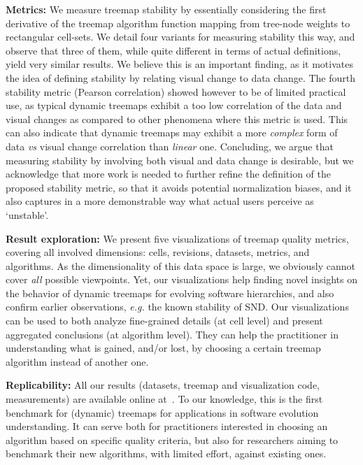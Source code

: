 \noindent\textbf{Metrics:} We measure treemap stability by essentially considering the first derivative of the treemap algorithm function mapping from tree-node weights to rectangular cell-sets. We detail four variants for measuring stability this way, and observe that three of them, while quite different in terms of actual definitions, yield very similar results. We believe this is an important finding, as it motivates the idea of defining stability by relating visual change to data change. The fourth stability metric (Pearson correlation) showed however to be of limited practical use, as typical dynamic treemaps exhibit a too low correlation of the data and visual changes as compared to other phenomena where this metric is used. This can also indicate that dynamic treemaps may exhibit a more \emph{complex} form of data \emph{vs} visual change correlation than \emph{linear} one. 
Concluding, we argue that measuring stability by involving both visual and data change is desirable, but we acknowledge that more work is needed to further refine the definition of the proposed stability metric, so that it avoids potential normalization biases, and it also captures in a more demonstrable way what actual users perceive as `unstable'.

\noindent\textbf{Result exploration:} We present five visualizations of treemap quality metrics, covering all involved dimensions: cells, revisions, datasets, metrics, and algorithms. As the dimensionality of this data space is large, we obviously cannot cover \emph{all} possible viewpoints. Yet, our visualizations help finding novel insights on the behavior of dynamic treemaps for evolving software hierarchies, and also confirm earlier observations, \emph{e.g.} the known stability of SND. Our visualizations can be used to both analyze fine-grained details (at cell level) and present aggregated conclusions (at algorithm level). They can help the practitioner in understanding what is gained, and/or lost, by choosing a certain treemap algorithm instead of another one.

\noindent\textbf{Replicability:} All our results (datasets, treemap and visualization code, measurements) are available online at~\citep{benchmark}. To our knowledge, this is the first benchmark for (dynamic) treemaps for applications in software evolution understanding. It can serve both for practitioners interested in choosing an algorithm based on specific quality criteria, but also for researchers aiming to benchmark their new algorithms, with limited effort, against existing ones.

